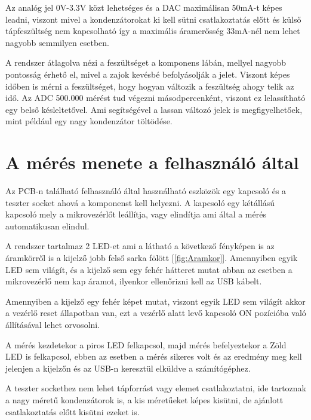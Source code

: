 Az analóg jel 0V-3.3V közt lehetséges és a DAC maximálisan 50mA-t képes leadni, viszont
mivel a kondenzátorokat ki kell sütni csatlakoztatás előtt és külső tápfeszültség nem 
kapcsolható így a maximális áramerősség 33mA-nél nem lehet nagyobb semmilyen esetben.

A rendszer átlagolva nézi a feszültséget a komponens lábán, mellyel nagyobb pontosság
érhető el, mivel a zajok kevésbé befolyásolják a jelet. Viszont képes időben is mérni
a feszültséget, hogy hogyan változik a feszültség ahogy telik az idő. Az ADC 500.000 mérést
tud végezni másodpercenként, viszont ez lelassítható egy belső késleltetővel. Ami segítségével
a lassan változó jelek is megfigyelhetőek, mint például egy nagy kondenzátor töltödése.

\section{A mérés menete a felhasználó által}

Az PCB-n található felhasználó által használható eszközök egy kapcsoló és a 
teszter socket ahová a komponenst kell helyezni. A kapcsoló egy kétállású
kapcsoló mely a mikrovezérlőt leállítja, vagy elindítja ami által a mérés
automatikusan elindul.

A rendszer tartalmaz 2 LED-et ami a látható a következő fényképen is az
áramkörről is a kijelző jobb felső sarka fölött [\ref{fig:Aramkor}]. 
Amennyiben egyik LED sem világít, és a kijelző sem egy fehér hátteret
mutat abban az esetben a mikrovezérlő nem kap áramot, ilyenkor ellenőrizni
kell az USB kábelt.

Amennyiben a kijelző egy fehér képet mutat, viszont egyik LED sem világít akkor
a vezérlő reset állapotban van, ezt a vezérlő alatt levő kapcsoló ON 
pozícióba való állításával lehet orvosolni.

A mérés kezdetekor a piros LED felkapcsol, majd mérés befelyeztekor a Zöld 
LED is felkapcsol, ebben az esetben a mérés sikeres volt és az eredmény meg 
kell jelenjen a kijelzőn és az USB-n keresztül elküldve a számítógéphez.

A teszter sockethez nem lehet tápforrást vagy elemet csatlakoztatni, ide tartoznak
a nagy méretű kondenzátorok is, a kis méretűeket képes kisütni, de ajánlott 
csatlakoztatás előtt kisütni ezeket is.

